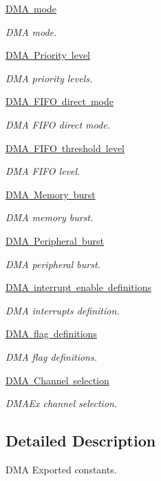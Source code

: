 \begin{DoxyCompactItemize}
\mbox{\hyperlink{group___d_m_a__mode}{D\+M\+A mode}}
\begin{DoxyCompactList}\small\item\em D\+MA mode. \end{DoxyCompactList}\item 
\mbox{\hyperlink{group___d_m_a___priority__level}{D\+M\+A Priority level}}
\begin{DoxyCompactList}\small\item\em D\+MA priority levels. \end{DoxyCompactList}\item 
\mbox{\hyperlink{group___d_m_a___f_i_f_o__direct__mode}{D\+M\+A F\+I\+F\+O direct mode}}
\begin{DoxyCompactList}\small\item\em D\+MA F\+I\+FO direct mode. \end{DoxyCompactList}\item 
\mbox{\hyperlink{group___d_m_a___f_i_f_o__threshold__level}{D\+M\+A F\+I\+F\+O threshold level}}
\begin{DoxyCompactList}\small\item\em D\+MA F\+I\+FO level. \end{DoxyCompactList}\item 
\mbox{\hyperlink{group___d_m_a___memory__burst}{D\+M\+A Memory burst}}
\begin{DoxyCompactList}\small\item\em D\+MA memory burst. \end{DoxyCompactList}\item 
\mbox{\hyperlink{group___d_m_a___peripheral__burst}{D\+M\+A Peripheral burst}}
\begin{DoxyCompactList}\small\item\em D\+MA peripheral burst. \end{DoxyCompactList}\item 
\mbox{\hyperlink{group___d_m_a__interrupt__enable__definitions}{D\+M\+A interrupt enable definitions}}
\begin{DoxyCompactList}\small\item\em D\+MA interrupts definition. \end{DoxyCompactList}\item 
\mbox{\hyperlink{group___d_m_a__flag__definitions}{D\+M\+A flag definitions}}
\begin{DoxyCompactList}\small\item\em D\+MA flag definitions. \end{DoxyCompactList}\item 
\mbox{\hyperlink{group___d_m_a_ex___channel__selection}{D\+M\+A Channel selection}}
\begin{DoxyCompactList}\small\item\em D\+M\+A\+Ex channel selection. \end{DoxyCompactList}\end{DoxyCompactItemize}


\subsection{Detailed Description}
D\+MA Exported constants. 

